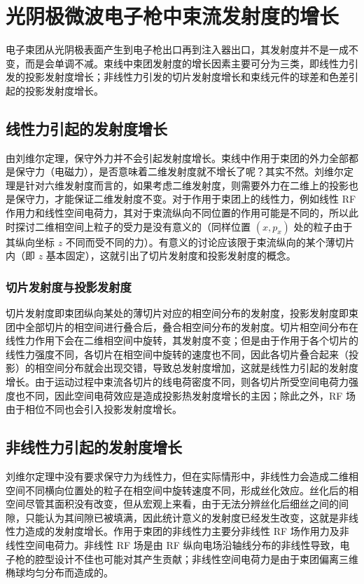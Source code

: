 \section{光阴极微波电子枪中束流发射度的增长}
电子束团从光阴极表面产生到电子枪出口再到注入器出口，其发射度并不是一成不变，而是会单调不减。束线中束团发射度的增长因素主要可分为三类，即线性力引发的投影发射度增长；非线性力引发的切片发射度增长和束线元件的球差和色差引起的投影发射度增长。
\subsection{线性力引起的发射度增长}
由刘维尔定理，保守外力并不会引起发射度增长。束线中作用于束团的外力全部都是保守力（电磁力），是否意味着二维发射度就不增长了呢？其实不然。刘维尔定理是针对六维发射度而言的，如果考虑二维发射度，则需要外力在二维上的投影也是保守力，才能保证二维发射度不变。对于作用于束团上的线性力，例如线性 RF 作用力和线性空间电荷力，其对于束流纵向不同位置的作用可能是不同的，所以此时探讨二维相空间上粒子的受力是没有意义的（同样位置 $(x, p_x)$ 处的粒子由于其纵向坐标 $z$ 不同而受不同的力）。有意义的讨论应该限于束流纵向的某个薄切片内（即 $z$ 基本固定），这就引出了切片发射度和投影发射度的概念。

\subsubsection{切片发射度与投影发射度}
切片发射度即束团纵向某处的薄切片对应的相空间分布的发射度，投影发射度即束团中全部切片的相空间进行叠合后，叠合相空间分布的发射度。切片相空间分布在线性力作用下会在二维相空间中旋转，其发射度不变；但是由于作用于各个切片的线性力强度不同，各切片在相空间中旋转的速度也不同，因此各切片叠合起来（投影）的相空间分布就会出现交错，导致总发射度增加，这就是线性力引起的发射度增长。由于运动过程中束流各切片的线电荷密度不同，则各切片所受空间电荷力强度也不同，因此空间电荷效应是造成投影热发射度增长的主因；除此之外，RF 场由于相位不同也会引入投影发射度增长。

\subsection{非线性力引起的发射度增长}
刘维尔定理中没有要求保守力为线性力，但在实际情形中，非线性力会造成二维相空间不同横向位置处的粒子在相空间中旋转速度不同，形成丝化效应。丝化后的相空间尽管其面积没有改变，但从宏观上来看，由于无法分辨丝化后细丝之间的间隙，只能认为其间隙已被填满，因此统计意义的发射度已经发生改变，这就是非线性力造成的发射度增长。作用于束团的非线性力主要分非线性 RF 场作用力及非线性空间电荷力。非线性 RF 场是由 RF 纵向电场沿轴线分布的非线性导致，电子枪的腔型设计不佳也可能对其产生贡献；非线性空间电荷力是由于束团偏离三维椭球均匀分布而造成的。

